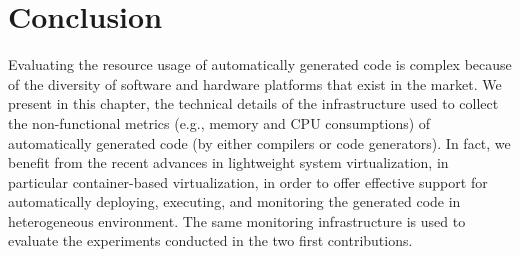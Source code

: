 \section{Conclusion}
\label{mon:coclusion}
Evaluating the resource usage of automatically generated code is complex because of the diversity of software and hardware platforms that exist in the market. We present in this chapter, the technical details of the infrastructure used to collect the non-functional metrics (e.g., memory and CPU consumptions) of automatically generated code (by either compilers or code generators). In fact, we benefit from the recent advances in lightweight system virtualization, in particular container-based virtualization, in order to offer effective support for automatically deploying, executing, and monitoring the generated code in heterogeneous environment.
The same monitoring infrastructure is used to evaluate the experiments conducted in the two first contributions.